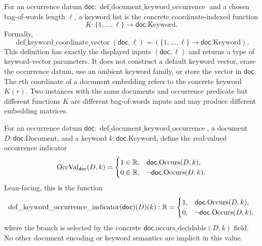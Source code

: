 \begin{definition}
  \label{def:keyword-coordinate-vector}
  For an occurrence datum
  $\mathsf{doc}:\operatorname{def\_document\_keyword\_occurrence}$ and a chosen
  bag-of-words length $\ell$, a keyword list is the concrete coordinate-indexed
  function
  \[
    K:\{1,\ldots,\ell\}\to\mathsf{doc}.\mathrm{Keyword}.
  \]
  Formally,
  \[
    \operatorname{def\_keyword\_coordinate\_vector}(\mathsf{doc},\ell)
      =(\{1,\ldots,\ell\}\to\mathsf{doc}.\mathrm{Keyword}).
  \]
  This definition has exactly the displayed inputs $(\mathsf{doc},\ell)$ and
  returns a type of keyword-vector parameters.  It does not construct a default
  keyword vector, erase the occurrence datum, use an ambient keyword family, or
  store the vector in $\mathsf{doc}$.  The $r$th coordinate of a document
  embedding refers to the concrete keyword $K(r)$.  Two instances with the same
  documents and occurrence predicate but different functions $K$ are different
  bag-of-words inputs and may produce different embedding matrices.
\end{definition}

\begin{definition}
  \label{def:keyword-occurrence-indicator}
  For an occurrence datum
  $\mathsf{doc}:\operatorname{def\_document\_keyword\_occurrence}$, a document
  $D:\mathsf{doc}.\mathrm{Document}$, and a keyword
  $k:\mathsf{doc}.\mathrm{Keyword}$, define the real-valued occurrence
  indicator
  \[
    \operatorname{OccVal}_{\mathsf{doc}}(D,k)=
    \begin{cases}
      1\in\mathbb{R}, & \mathsf{doc}.\mathrm{Occurs}(D,k),\\
      0\in\mathbb{R}, & \neg\mathsf{doc}.\mathrm{Occurs}(D,k).
    \end{cases}
  \]
  Lean-facing, this is the function
  \[
    \operatorname{def\_keyword\_occurrence\_indicator}
      (\mathsf{doc})(D)(k):\mathbb{R}
      =
      \begin{cases}
        1, & \mathsf{doc}.\mathrm{Occurs}(D,k),\\
        0, & \neg\mathsf{doc}.\mathrm{Occurs}(D,k),
      \end{cases}
  \]
  where the branch is selected by the concrete
  $\mathsf{doc}.\mathrm{occurs\_decidable}(D,k)$ field.  No other document
  encoding or keyword semantics are implicit in this value.
\end{definition}

